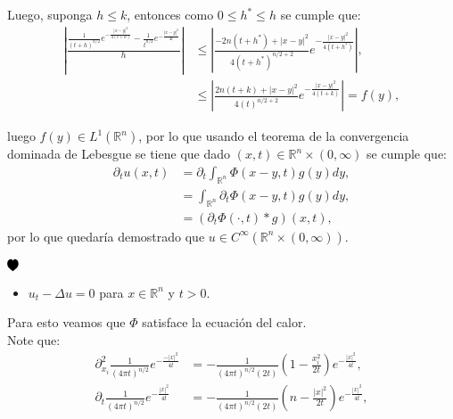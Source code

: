 \documentclass{beamer}
\newcommand{\heart}{\begin{tikzpicture}[scale=0.001cm,rotate=180]
\fill[black] (0,0) 
        .. controls (0,-0.5) and (0.3,-1.8) .. (2,-2)
        .. controls (4.2,-2) and (5.5,0) .. (5.5,3)
        .. controls (5.5,5.5) and (3.5,7.5) .. (0,10)
        .. controls (-3.5,7.5) and (-5.5,5.5) .. (-5.5,3)
        .. controls (-5.5,0) and (-4.2,-2) .. (-2,-2)
        .. controls (-0.3,-1.8) and (0,-0.5) .. (0,0);
\end{tikzpicture}}
\newcommand{\demostrado}[0]{ \begin{flushright} $\heart{}$ \end{flushright}}
\begin{document}
\begin{frame}
  \begin{block}{}
    Luego, suponga $h\leq k$, entonces como $0\leq h^*\leq h$ se cumple que:
    \begin{align*}
      \left| \frac{\frac{1}{(t+h)^{n/2}}e^{-\frac{|x-y|^2}{4(t+h)}}-\frac{1}{t^{n/2}}e^{-\frac{|x-y|^2}{4t}}}{h} \right|&\leq \left| \frac{-2n(t+h^*)+|x-y|^2}{4(t+h^*)^{n/2+2}}e^{-\frac{|x-y|^2}{4(t+h^*)}} \right|,\\
      &\leq \left| \frac{2n(t+k)+|x-y|^2}{4(t)^{n/2+2}}e^{-\frac{|x-y|^2}{4(t+k)}} \right|=f(y),
    \end{align*}
  \end{block}
\end{frame}

\begin{frame}
  \begin{block}{}
    luego $f(y)\in L^1(\mathbb{R}^{n})$, por lo que usando el teorema de la convergencia dominada de Lebesgue se tiene que dado $(x,t)\in\mathbb{R}^{n}\times (0,\infty)$ se cumple que:
    \begin{align*}
      \partial_{t}u(x,t)&=\partial_{t}\int_{\mathbb{R}^{n}}\Phi(x-y,t)g(y)dy,\\
      &=\int_{\mathbb{R}^{n}}\partial_{t}\Phi(x-y,t)g(y)dy,\\
      &=(\partial_{t}\Phi(\cdot,t)*g)(x,t),
    \end{align*}
    por lo que quedaría demostrado que $u\in C^{\infty}(\mathbb{R}^{n}\times (0,\infty))$.
    \demostrado
  \end{block}  
\end{frame}

\begin{frame}
  \begin{block}{}
    \begin{itemize}
      \item $u_t-\Delta u=0$ para $x\in\mathbb{R}^{n}$ y $t>0$. 
    \end{itemize}
    Para esto veamos que $\Phi$ satisface la ecuación del calor.\\
    Note que:
    \begin{align*}
      \partial_{x_i}^2\frac{1}{(4\pi t)^{n/2}}e^{-\frac{-|x|^2}{4t}}&=-\frac{1}{(4\pi t)^{n/2}(2t)}\left( 1-\frac{x_i^2}{2t} \right)e^{-\frac{|x|^2}{4t}},\\
      \partial_{t}\frac{1}{(4\pi t)^{n/2}}e^{-\frac{|x|^2}{4t}}&=-\frac{1}{(4\pi t)^{n/2}(2t)}\left( n-\frac{|x|^2}{2t} \right)e^{-\frac{|x|^2}{4t}},
    \end{align*}
  \end{block}
\end{frame}
\end{document}
